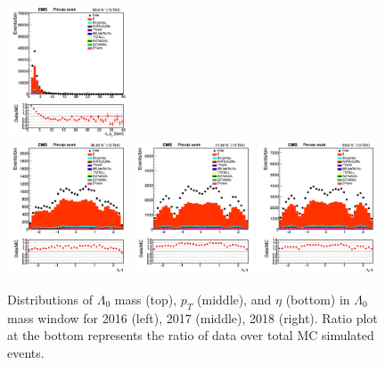 \documentclass{cernatlasnote}
\begin{document}
\begin{figure}[htp]
 \includegraphics[width=0.32\textwidth]{images/emu_channel/2018/18_Range_0pt2_1pt8/Reco_L0_pt_M_wind_Linear.png}\\
 \includegraphics[width=0.32\textwidth]{images/emu_channel/2016/16_Range_0pt2_1pt8/Reco_L0_eta_M_wind_Linear.png}
\includegraphics[width=0.32\textwidth]{images/emu_channel/2017/17_Range_0pt2_1pt8/Reco_L0_eta_M_wind_Linear.png}
 \includegraphics[width=0.32\textwidth]{images/emu_channel/2018/18_Range_0pt2_1pt8/Reco_L0_eta_M_wind_Linear.png}\\
 \caption{Distributions of $\Lambda_{0}$  mass (top), $p_{T}$ (middle), and $\eta$ (bottom) in $\Lambda_{0}$ mass window for 2016 (left), 2017 (middle), 2018 (right). Ratio plot at the bottom represents the ratio of data over total MC simulated events.}
 \label{fig:L0DATAMC}
  \end{figure}
  
\end{document}
